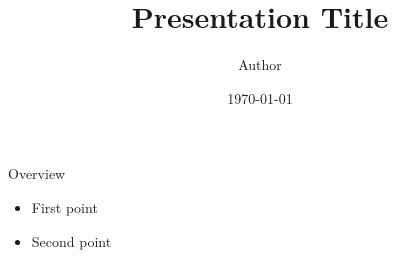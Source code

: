 \documentclass{beamer}
\title{Presentation Title}
\author{Author}
\date{\today}
\begin{document}
\begin{frame}
    \titlepage
\end{frame}

\begin{frame}{Overview}
    \begin{itemize}
        \item First point
        \item Second point
    \end{itemize}
\end{frame}
\end{document}

